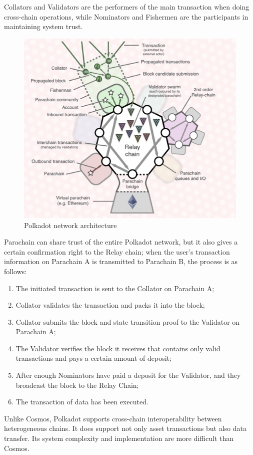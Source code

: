 \noindent Collators and Validators are the performers of the main transaction when doing cross-chain operations, while Nominators and Fishermen are the participants in maintaining system trust.\\


\begin{figure}[H]
    \includegraphics[width=1\textwidth]{./figures/Polkadot.jpg}
    \centering
    \caption{Polkadot network architecture \protect\footnotemark}
    \centering
\end{figure}

\noindent Parachain can share trust of the entire Polkadot network, but it also gives a certain confirmation right to the Relay chain; when the user's transaction information on Parachain A is transmitted to Parachain B, the process is as follows:
\begin{enumerate}
    \item The initiated transaction is sent to the Collator on Parachain A;
    \item Collator validates the transaction and packs it into the block; 
    \item Collator submits the block and state transition proof to the Validator on Parachain A;
    \item The Validator verifies the block it receives that contains only valid transactions and pays a certain amount of deposit;
    \item  After enough Nominators have paid a deposit for the Validator, and they broadcast the block to the Relay Chain;
    \item The transaction of data has been executed.
\end{enumerate}
\noindent Unlike Cosmos, Polkadot supports cross-chain interoperability between heterogeneous chains. It does support not only asset transactions but also data transfer. Its system complexity and implementation are more difficult than Cosmos.


